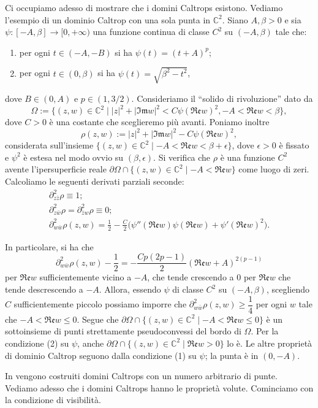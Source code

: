 Ci occupiamo adesso di mostrare che i domini Caltrops esistono. Vediamo l'esempio di un dominio Caltrop con una sola punta in $\mathbb{C}^2$. Siano $A,\beta>0$ e sia $\psi:[-A,\beta]\longrightarrow[0,+\infty)$ una funzione continua di classe $C^2$ su $(-A,\beta)$ tale che:
\begin{enumerate}[label={(\arabic*)}]
    \item per ogni $t\in(-A,-B)$ si ha $\psi(t)=(t+A)^p$;
    \item per ogni $t\in(0,\beta)$ si ha $\psi(t)=\sqrt{\beta^2-t^2}$,
\end{enumerate}
dove $B\in(0,A)$ e $p\in(1,3/2)$. Consideriamo il ``solido di rivoluzione'' dato da
$$\Omega:=\{(z,w)\in\mathbb{C}^2\mid |z|^2+|\mathfrak{Im}w|^2<C\psi(\mathfrak{Re}w)^2,-A<\mathfrak{Re}w<\beta\},$$
dove $C>0$ è una costante che sceglieremo più avanti. Poniamo inoltre
$$\rho(z,w):=|z|^2+|\mathfrak{Im}w|^2-C\psi(\mathfrak{Re}w)^2,$$
considerata sull'insieme $\{(z,w)\in\mathbb{C}^2\mid -A<\mathfrak{Re}w<\beta+\epsilon\}$, dove $\epsilon>0$ è fissato e $\psi^2$ è estesa nel modo ovvio su $(\beta,\epsilon)$. Si verifica che $\rho$ è una funzione $C^2$ avente l'ipersuperficie reale $\partial\Omega\cap\{(z,w)\in\mathbb{C}^2\mid -A<\mathfrak{Re}w\}$ come luogo di zeri. Calcoliamo le seguenti derivati parziali seconde:
\begin{gather*}
    \partial^2_{z\bar{z}}\rho\equiv 1;\\
    \partial^2_{z\bar{w}}\rho=\partial^2_{\bar{z}w}\rho\equiv 0;\\
    \partial^2_{w\bar{w}}\rho(z,w)=\frac{1}{2}-\frac{C}{2}\big(\psi''(\mathfrak{Re}w)\psi(\mathfrak{Re}w)+\psi'(\mathfrak{Re}w)^2\big).
\end{gather*}

In particolare, si ha che
$$\partial^2_{w\bar{w}}\rho(z,w)-\frac{1}{2}=-\frac{Cp(2p-1)}{2}(\mathfrak{Re}w+A)^{2(p-1)}$$
per $\mathfrak{Re}w$ sufficientemente vicino a $-A$, che tende crescendo a $0$ per $\mathfrak{Re}w$ che tende descrescendo a $-A$. Allora, essendo $\psi$ di classe $C^2$ su $(-A,\beta)$, scegliendo $C$ sufficientemente piccolo possiamo imporre che $\partial^2_{w\bar{w}}\rho(z,w)\ge\dfrac{1}{4}$ per ogni $w$ tale che $-A<\mathfrak{Re}w\le 0$. Segue che $\partial\Omega\cap\{(z,w)\in\mathbb{C}^2\mid -A<\mathfrak{Re}w\le 0\}$ è un sottoinsieme di punti strettamente pseudoconvessi del bordo di $\Omega$. Per la condizione (2) su $\psi$, anche $\partial\Omega\cap\{(z,w)\in\mathbb{C}^2\mid \mathfrak{Re}w>0\}$ lo è. Le altre proprietà di dominio Caltrop seguono dalla condizione (1) su $\psi$; la punta è in $(0,-A)$.

In \cite[Section 3.2]{CMS} vengono costruiti domini Caltrops con un numero arbitrario di punte. \\

Vediamo adesso che i domini Caltrops hanno le proprietà volute. Cominciamo con la condizione di visibilità.